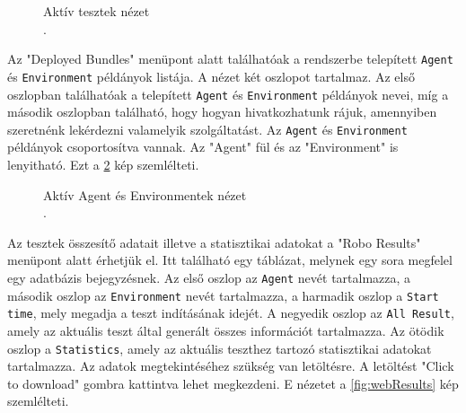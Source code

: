 \begin{figure}[h!]
  \centering
  \caption[Aktív tesztek nézet]%
  {Aktív tesztek nézet\\
  {\white .}\hfill\url{}}
  \label{fig:webAktivTesztek}
\end{figure}


Az "Deployed Bundles" menüpont alatt találhatóak a rendszerbe telepített \texttt{Agent} és \texttt{Environment} példányok listája. A nézet két oszlopot tartalmaz. Az első oszlopban találhatóak a telepített \texttt{Agent} és \texttt{Environment} példányok nevei, míg a második oszlopban található, hogy hogyan hivatkozhatunk rájuk, amennyiben szeretnénk lekérdezni valamelyik szolgáltatást. Az \texttt{Agent} és \texttt{Environment} példányok csoportosítva vannak. Az "Agent" fül és az "Environment" is lenyitható. Ezt a \ref{fig:webAktivBatyuk} kép szemlélteti.

\begin{figure}[h!]
  \centering
  \caption[Aktív Agent és Environmentek nézet]%
  {Aktív Agent és Environmentek nézet\\
  {\white .}\hfill\url{}}
  \label{fig:webAktivBatyuk}
\end{figure}

Az tesztek összesítő adatait illetve a statisztikai adatokat a "Robo Results" menüpont alatt érhetjük el. Itt található egy táblázat, melynek egy sora megfelel egy adatbázis bejegyzésnek. Az első oszlop az \texttt{Agent} nevét tartalmazza, a második oszlop az \texttt{Environment} nevét tartalmazza, a harmadik oszlop a \texttt{Start time}, mely megadja a teszt indításának idejét. A negyedik oszlop az \texttt{All Result}, amely az aktuális teszt által generált összes információt tartalmazza. Az ötödik oszlop a \texttt{Statistics}, amely az aktuális teszthez tartozó statisztikai adatokat tartalmazza. Az adatok megtekintéséhez szükség van letöltésre. A letöltést "Click to download" gombra kattintva lehet megkezdeni. E nézetet a \ref{fig:webResults} kép szemlélteti.


